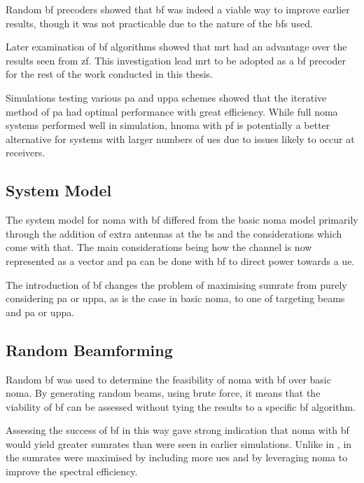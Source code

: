 \par
Random \ac{bf} precoders showed that \ac{bf} was indeed a viable way to improve earlier results, though it was not practicable due to the nature of the \ac{bfs} used.

\par
Later examination of \ac{bf} algorithms showed that \ac{mrt} had an advantage over the results seen from \ac{zf}.
This investigation lead \ac{mrt} to be adopted as a \ac{bf} precoder for the rest of the work conducted in this thesis.

\par
Simulations testing various \ac{pa} and \ac{uppa} schemes showed that the iterative method of \ac{pa} had optimal performance with great efficiency.
While full \ac{noma} systems performed well in simulation, \ac{hnoma} with \ac{pf} is potentially a better alternative for systems with larger numbers of \acp{ue} due to issues likely to occur at receivers.
\subsection{System Model}
The system model for \ac{noma} with \ac{bf} differed from the basic \ac{noma} model primarily through the addition of extra antennas at the \ac{bs} and the considerations which come with that.
The main considerations being how the channel is now represented as a vector and \ac{pa} can be done with \ac{bf} to direct power towards a \ac{ue}.

\par
The introduction of \ac{bf} changes the problem of maximising sumrate from purely considering \ac{pa} or \ac{uppa}, as is the case in basic \ac{noma}, to one of targeting beams and \ac{pa} or \ac{uppa}.

\subsection{Random Beamforming}
Random \ac{bf} was used to determine the feasibility of \ac{noma} with \ac{bf} over basic \ac{noma}.
By generating random beams, using brute force, it means that the viability of \ac{bf} can be assessed without tying the results to a specific \ac{bf} algorithm.

\par
Assessing the success of \ac{bf} in this way gave strong indication that \ac{noma} with \ac{bf} would yield greater sumrates than were seen in earlier simulations.
Unlike in , in  the sumrates were maximised by including more \acp{ue} and by leveraging \ac{noma} to improve the spectral efficiency.

